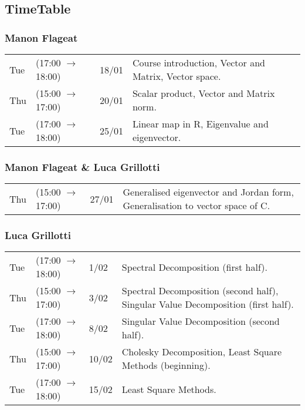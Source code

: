 \documentclass{report}
\begin{document}
        \subsection*{TimeTable}
            \subsubsection*{Manon Flageat}
            \begin{center}
                \begin{tabular}{l l l p{}}
                    Tue & (17:00 $\to$ 18:00) & 18/01 & Course introduction, Vector and Matrix, Vector space. \\
                    Thu & (15:00 $\to$ 17:00) & 20/01 & Scalar product, Vector and Matrix norm. \\
                    Tue & (17:00 $\to$ 18:00) & 25/01 & Linear map in R, Eigenvalue and eigenvector. \\
                \end{tabular}
            \end{center}
            \subsubsection*{Manon Flageat \& Luca Grillotti}
            \begin{center}
                \begin{tabular}{l l l p{}}
                    Thu & (15:00 $\to$ 17:00) & 27/01 & Generalised eigenvector and Jordan form, Generalisation to vector space of C. \\
                \end{tabular}
            \end{center}
            \subsubsection*{Luca Grillotti}
            \begin{center}
                \begin{tabular}{l l l p{}}
                    Tue & (17:00 $\to$ 18:00) & 1/02 & Spectral Decomposition (first half). \\
                    Thu & (15:00 $\to$ 17:00) & 3/02 & Spectral Decomposition (second half), Singular Value Decomposition (first half). \\
                    Tue & (17:00 $\to$ 18:00) & 8/02 & Singular Value Decomposition (second half). \\
                    Thu & (15:00 $\to$ 17:00) & 10/02 & Cholesky Decomposition, Least Square Methods (beginning). \\
                    Tue & (17:00 $\to$ 18:00) & 15/02 & Least Square Methods. \\
                \end{tabular}
            \end{center}
\end{document}
